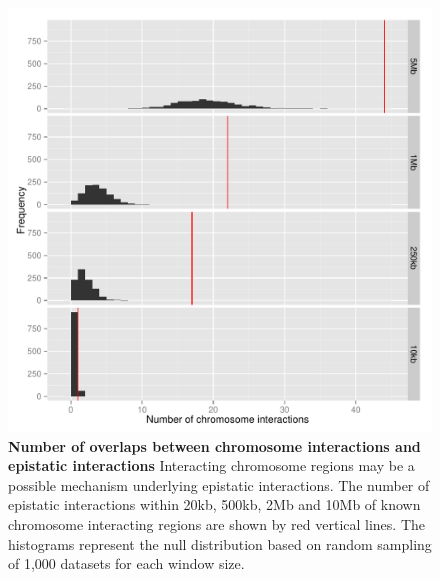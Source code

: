 \documentclass{article}
\begin{document}
\begin{figure}
	\centering
	\includegraphics[width=5in]{chromosome_interactions}
	\caption{\textbf{Number of overlaps between chromosome interactions and epistatic interactions} Interacting chromosome regions may be a possible mechanism underlying epistatic interactions. The number of epistatic interactions within 20kb, 500kb, 2Mb and 10Mb of known chromosome interacting regions are shown by red vertical lines. The histograms represent the null distribution based on random sampling of 1,000 datasets for each window size.}
	\label{fig:chromosomeinteractions}
\end{figure}
\clearpage
\end{document}
